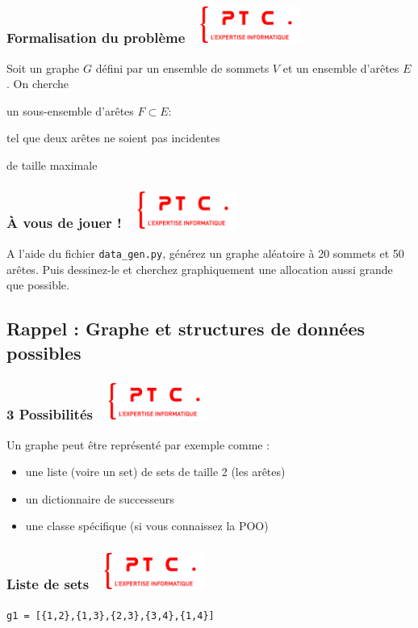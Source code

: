 \documentclass[11pt]{beamer}
\newenvironment{slide}[1]{%
\begin{frame}[environment=slide]
\frametitle{#1~\hfill~\includegraphics[height=1.2cm]{./epitech.png}}
}{%
\end{frame}
}
\begin{document}
\begin{slide}{Formalisation du problème}
Soit un graphe $G$ défini par un ensemble de sommets $V$ et un ensemble d'arêtes $E$. On cherche 

\vspace{0.5cm}

\pause

un sous-ensemble d'arêtes $F \subset E$:

\vspace{0.5cm}

\pause

tel que deux arêtes ne soient pas incidentes

\vspace{0.5cm}

\pause

de taille maximale

\end{slide}

\begin{slide}{{\`A} vous de jouer !}

A l'aide du fichier \texttt{data\_gen.py}, générez un graphe aléatoire à 20 sommets et 50 arêtes. Puis dessinez-le et cherchez graphiquement une allocation aussi grande que possible.

\end{slide}


\subsection{Rappel : Graphe et structures de données possibles}

\begin{slide}{3 Possibilités}

Un graphe peut être représenté par exemple comme :

\begin{itemize}

	\item une liste (voire un set) de sets de taille 2 (les arêtes)
	\item un dictionnaire de successeurs
	\item une classe spécifique (si vous connaissez la POO)

\end{itemize}

\end{slide}

\begin{slide}{Liste de sets}

\begin{center}
\end{center}

\texttt{g1 = [\{1,2\},\{1,3\},\{2,3\},\{3,4\},\{1,4\}]}

\end{slide}
\end{document}
